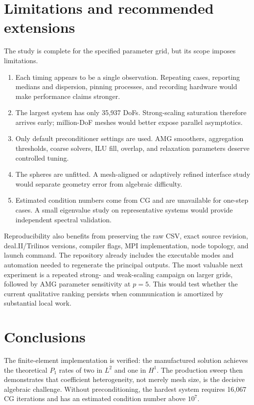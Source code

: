 \documentclass[10pt,a4paper]{article}
\begin{document}
\section{Limitations and recommended extensions}
The study is complete for the specified parameter grid, but its scope imposes limitations.
\begin{enumerate}
 \item Each timing appears to be a single observation. Repeating cases, reporting medians and
 dispersion, pinning processes, and recording hardware would make performance claims stronger.
 \item The largest system has only 35,937 DoFs. Strong-scaling saturation therefore arrives early;
 million-DoF meshes would better expose parallel asymptotics.
 \item Only default preconditioner settings are used. AMG smoothers, aggregation thresholds,
 coarse solvers, ILU fill, overlap, and relaxation parameters deserve controlled tuning.
 \item The spheres are unfitted. A mesh-aligned or adaptively refined interface study would separate
 geometry error from algebraic difficulty.
 \item Estimated condition numbers come from CG and are unavailable for one-step cases. A small
 eigenvalue study on representative systems would provide independent spectral validation.
\end{enumerate}

Reproducibility also benefits from preserving the raw CSV, exact source revision, deal.II/Trilinos
versions, compiler flags, MPI implementation, node topology, and launch command. The repository
already includes the executable modes and automation needed to regenerate the principal outputs.
The most valuable next experiment is a repeated strong- and weak-scaling campaign on larger grids,
followed by AMG parameter sensitivity at $p=5$. This would test whether the current qualitative
ranking persists when communication is amortized by substantial local work.

\newpage
\section{Conclusions}
The finite-element implementation is verified: the manufactured solution achieves the theoretical
$P_1$ rates of two in $L^2$ and one in $H^1$. The production sweep then demonstrates that
coefficient heterogeneity, not merely mesh size, is the decisive algebraic challenge. Without
preconditioning, the hardest system requires 16,067 CG iterations and has an estimated condition
number above $10^7$.
\end{document}
